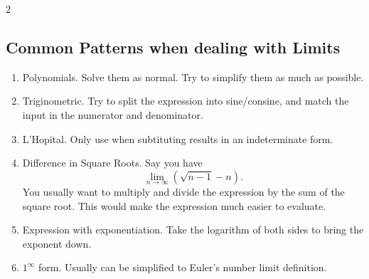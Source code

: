 \documentclass[5pt, a4paper]{article}
\begin{document}
\begin{multicols}{2}
    \subsection*{Common Patterns when dealing with Limits}
    \begin{enumerate}
        \item Polynomials.
            Solve them as normal. Try to simplify them as much as possible.
        \item Triginometric.
            Try to split the expression into sine/consine, and match the input
            in the numerator and denominator.
        \item L'Hopital.
            Only use when subtituting results in an indeterminate form.
        \item Difference in Square Roots.
            Say you have \[
                \lim_{n \to \infty}\left( \sqrt{n - 1} - n \right) 
            .\] 
            You usually want to multiply and divide the expression by the sum of
            the square root. This would make the expression much easier to
            evaluate.
        \item Expression with exponentiation.
            Take the logarithm of both sides to bring the exponent down.
        \item $1^\infty$ form.
            Usually can be simplified to Euler's number limit definition.
    \end{enumerate}

\end{multicols}
\end{document}
